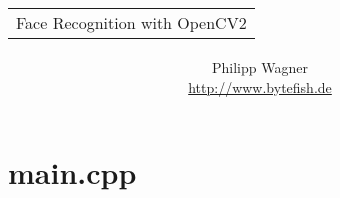 \documentclass[10pt]{article}
\title{\begin{tabular}{p{11cm}}\centering
Face Recognition with OpenCV2
\end{tabular}}
\author{Philipp Wagner\\\href{http://www.bytefish.de}{http://www.bytefish.de}}
\begin{document}
\maketitle
\tableofcontents








\appendix

\section{main.cpp}




\end{document}
